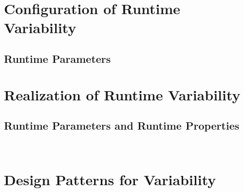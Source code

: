 

\subtitle{2. Runtime Variability and Design Patterns}
\author{Timo Kehrer}






\section{Configuration of Runtime Variability}

\subsection{Runtime Parameters}
\begin{frame}{\insertsubsection}
\end{frame}

\lessonslearned{
	\item \ldots
}{
	\item \ldots
}{
	\ldots
}

\sectionend

\section{Realization of Runtime Variability}

\subsection{Runtime Parameters and Runtime Properties}
\begin{frame}{\insertsubsection\ \mytitlesource{\featureide}}
\end{frame}

\lessonslearned{
	\item \ldots
}{
	\item \ldots
}{
	\ldots
}

\sectionend

\section{Design Patterns for Variability}



\lessonslearned{
	\item \ldots
}{
	\item \ldots
}{
	\ldots
}




